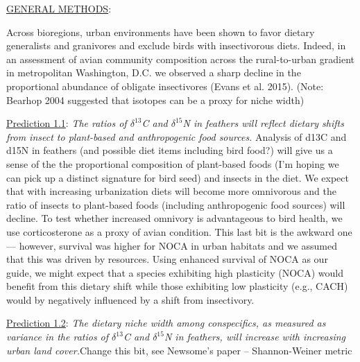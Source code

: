 \documentclass[12pt]{article}
\begin{document}
\noindent \underline{GENERAL METHODS}: 


 \par
Across bioregions, urban environments have been shown to favor dietary generalists and granivores and exclude birds with insectivorous diets. Indeed, in an assessment of avian community composition across the rural-to-urban gradient in metropolitan Washington, D.C. we observed a sharp decline in the proportional abundance of obligate insectivores (Evans et al. 2015). (Note: Bearhop 2004 suggested that isotopes can be a proxy for niche width)\par


\noindent \underline{Prediction 1.1}: \textit{The ratios of $\delta^{13}$C and $\delta^{15}$N in feathers will reflect dietary shifts from insect to plant-based and anthropogenic food sources.}  Analysis of d13C and d15N in feathers (and possible diet items including bird food?) will give us a sense of the the proportional composition of plant-based foods (I’m hoping we can pick up a distinct signature for bird seed) and insects in the diet. We expect that with increasing urbanization diets will become more omnivorous and the ratio of insects to plant-based foods (including anthropogenic food sources) will decline. To test whether increased omnivory is advantageous to bird health, we use corticosterone as a proxy of avian condition. This last bit is the awkward one — however, survival was higher for NOCA in urban habitats and we assumed that this was driven by resources. Using enhanced survival of NOCA as our guide, we might expect that a species exhibiting high plasticity (NOCA) would benefit from this dietary shift while those exhibiting low plasticity (e.g., CACH) would by negatively influenced by a shift from insectivory.\par


\noindent \underline{Prediction 1.2}: \textit{ The dietary niche width among conspecifics, as measured as variance in the ratios of $\delta^{13}$C and $\delta^{15}$N in feathers,  will increase with increasing urban land cover.}Change this bit, see Newsome's paper -- Shannon-Weiner metric \par
\end{document}
